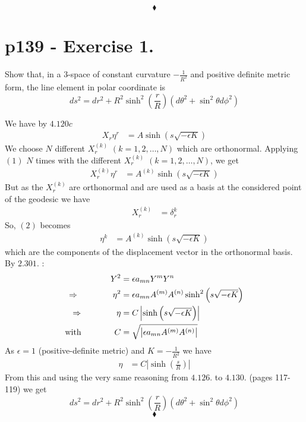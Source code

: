 $$\blacklozenge$$
\newpage

\section{p139 - Exercise 1.}
\begin{tcolorbox}
Show that, in a 3-space of constant curvature $-\frac{1}{R^2}$ and positive definite metric form, the line element in polar coordinate is 
$$ds^2= dr^2+R^2\sinh^2\left(\frac{r}{R}\right)\left(d\theta^2+\sin^2\theta d\phi^2\right)$$
\end{tcolorbox}
We have by $4.120c$
\begin{align}
X_r \eta^r &= A\sinh \left(s\sqrt{-\epsilon K}\right)
\end{align}
We choose $N$ different $X^{(k)}_r$ $(k= 1,2,\dots, N)$ which are orthonormal.
Applying $(1)$ $N$ times with the different $X^{(k)}_r$ $(k= 1,2,\dots, N)$, we get
\begin{align}
X^{(k)}_r \eta^r &= A^{(k)}\sinh \left(s\sqrt{-\epsilon K}\right)
\end{align}
But as the $X^{(k)}_r$ are orthonormal and are used as a basis at the considered point of the geodesic we have 
\begin{align}
X^{(k)}_r &= \delta^k_r
\end{align}
So, $(2)$ becomes
\begin{align}
\eta^k &= A^{(k)}\sinh \left(s\sqrt{-\epsilon K}\right)
\end{align}
which are the components of the displacement vector in the orthonormal basis. By $\mathbf{2.301.}$ :
\begin{align}
Y^2 &= \epsilon a_{mn} Y^m Y^n\\
\Rightarrow \quad\quad\quad\quad \eta^2 &= \epsilon a_{mn} A^{(m)} A^{(n)}\sinh^2 \left(s\sqrt{-\epsilon K}\right)\\
\Rightarrow \quad\quad\quad\quad \eta &= C\left|\sinh \left(s\sqrt{-\epsilon K}\right)\right|\\
\text{with}\quad\quad\quad\quad C&= \sqrt{\left|\epsilon a_{mn} A^{(m)} A^{(n)}\right|}
\end{align}
As $\epsilon =1$ (positive-definite metric) and $K=-\frac{1}{R^2}$
we have
\begin{align}
\eta &= C\left|\sinh \left(\frac{s}{R}\right)\right|
\end{align}
From this and using the very same reasoning from $4.126.$ to $4.130.$ (pages 117-119) we get 
$$ds^2= dr^2+R^2\sinh^2\left(\frac{r}{R}\right)\left(d\theta^2+\sin^2\theta d\phi^2\right)$$
$$\blacklozenge$$
\newpage


